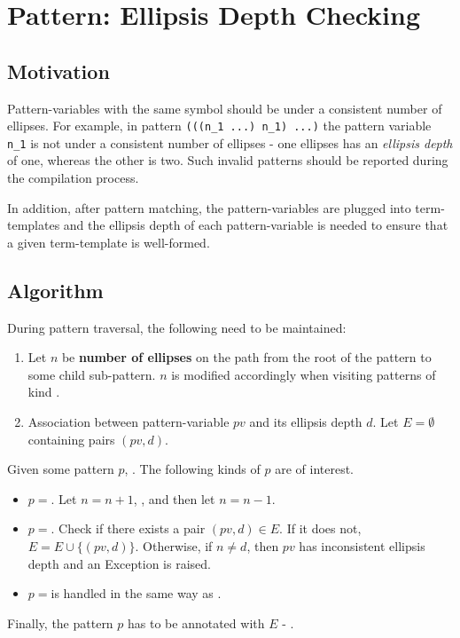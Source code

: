 \section{Pattern: Ellipsis Depth Checking}

\subsection{Motivation}

Pattern-variables with the same symbol should be under a consistent number of ellipses. For example, in pattern \texttt{(((n\_1 ...)\ n\_1)\ ...)} the pattern variable \texttt{n\_1} is not under a consistent number of ellipses - one ellipses has an \textit{ellipsis depth} of one, whereas the other is two. Such invalid patterns should be reported during the compilation process.

In addition, after pattern matching, the pattern-variables are plugged into term-templates and the ellipsis depth of each pattern-variable is needed to ensure that a given term-template is well-formed.

\subsection{Algorithm}

During pattern traversal, the following need to be maintained:

\begin{enumerate}
\item
Let $n$ be \textbf{number of ellipses} on the path from the root of the pattern to some child sub-pattern. $n$ is modified accordingly when visiting patterns of kind \RepeatNoArg.

\item Association between pattern-variable $pv$ and its ellipsis depth $d$. Let $E=\emptyset$ containing pairs $(pv, d)$.
\end{enumerate}

Given some pattern $p$, . The following kinds of $p$ are of interest.
\begin{itemize}
\item $p=$\space \PatternRepeat. Let $n=n+1$, , and then let $n=n-1$.
\item $p=$\space \BuiltInPattern. Check if there exists a pair $(pv, d) \in E$. If it does not, $E = E \cup \{ (pv, d) \}$. Otherwise, if $n \neq d$, then $pv$ has inconsistent ellipsis depth and an Exception is raised.
\item $p=$\space \NonTerminal \space is handled in the same way as \BuiltInPatternNoArg.
\end{itemize}

Finally, the pattern $p$ has to be annotated with $E$ - .
